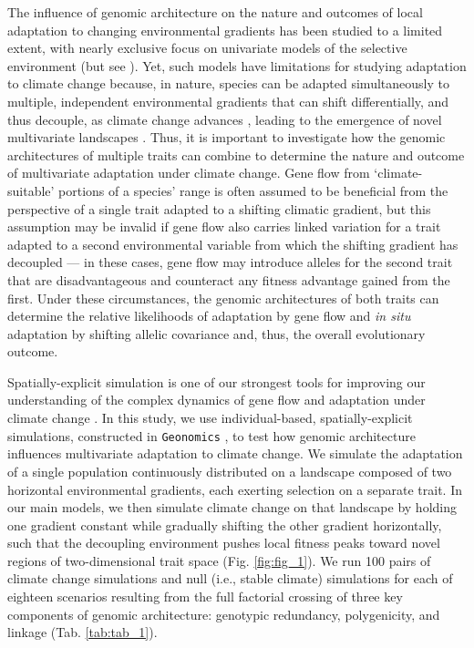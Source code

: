 \documentclass[9pt,twocolumn,twoside,lineno]{pnas-new}
\begin{document}
The influence of genomic architecture on the nature and outcomes
of local adaptation to changing environmental gradients
has been studied to a limited extent,
with nearly exclusive focus on univariate models
of the selective environment (but see \cite{schiffers}).
Yet, such models have limitations for studying adaptation to climate change
because, in nature, species can be adapted simultaneously to multiple,
independent environmental gradients \cite{guillaume} that can shift differentially,
and thus decouple, as climate change advances
\cite{crimmins,daly},
leading to the emergence of novel multivariate landscapes
\cite{williams_novel_climates,williams_projected_novel_disappearing,fitzpatrick}.
Thus, it is important to investigate how the genomic architectures
of multiple traits can combine to determine the nature and outcome
of multivariate adaptation under climate change.
Gene flow from `climate-suitable' portions of a species' range
is often assumed to be beneficial from the perspective of a single trait
adapted to a shifting climatic gradient, but this assumption
may be invalid if gene flow also carries
linked variation for a trait
adapted to a second environmental variable
from which the shifting gradient has decoupled --- in these cases, gene flow may introduce alleles for the second trait that are disadvantageous and counteract any fitness advantage gained from the first.
Under these circumstances, the genomic architectures of both traits
can determine the relative likelihoods of adaptation by gene flow
and \textit{in situ} adaptation by shifting
allelic covariance
\cite{aitken_whitlock,schiffers} and, thus,
the overall evolutionary outcome.

Spatially-explicit simulation is one of our strongest tools
for improving our understanding of the complex dynamics of gene flow and adaptation
under climate change \cite{capblancq_review}.
In this study, we use individual-based, spatially-explicit simulations,
constructed in \texttt{Geonomics} \cite{terasaki_hart},
to test how genomic architecture influences multivariate adaptation to climate change.
We simulate the adaptation of a single population
continuously distributed on a landscape composed of two horizontal 
environmental gradients, each exerting selection on a separate trait.
In our main models, we then simulate climate change on that landscape by holding one gradient 
constant while gradually shifting the other gradient horizontally, such that
the decoupling environment pushes local fitness peaks toward novel regions 
of two-dimensional trait space (Fig. \ref{fig:fig_1}).
We run 100 pairs of climate change simulations
and null (i.e., stable climate) simulations for each of eighteen scenarios
resulting from the full factorial crossing of three key components
of genomic architecture: genotypic redundancy, polygenicity, and linkage
(Tab. \ref{tab:tab_1}).
\end{document}
